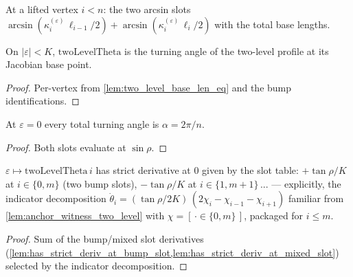 \begin{definition}
  \label{def:two_level_theta}
  At a lifted vertex $i < n$: the two arcsin slots
  $\arcsin(\kappa^{(\varepsilon)}_i\,\ell_{i-1}/2) +
   \arcsin(\kappa^{(\varepsilon)}_i\,\ell_i/2)$ with the total base lengths.
\end{definition}

\begin{lemma}
  \label{lem:turning_angle_two_level}
  On $|\varepsilon| < K$, $\mathrm{twoLevelTheta}$ is the turning angle of the
  two-level profile at its Jacobian base point.
\end{lemma}
\begin{proof}

\leanok
  Per-vertex from \cref{lem:two_level_base_len_eq} and the bump
  identifications.
\end{proof}

\begin{lemma}\leanok
[turning angle at $\varepsilon = 0$]
  \label{lem:two_level_theta_zero}
  At $\varepsilon = 0$ every total turning angle is $\alpha = 2\pi/n$.
\end{lemma}
\begin{proof}

\leanok
  Both slots evaluate at $\sin\rho$.
\end{proof}

\begin{lemma}
  \label{lem:has_strict_deriv_at_two_level_theta}
  $\varepsilon \mapsto \mathrm{twoLevelTheta}\,i$ has strict derivative at $0$
  given by the slot table: $+\tan\rho/K$ at $i \in \{0, m\}$ (two bump slots),
  $-\tan\rho/K$ at $i \in \{1, m{+}1\}$\,... --- explicitly, the indicator
  decomposition $\dot\theta_i = (\tan\rho/2K)\,(2\chi_i - \chi_{i-1} -
  \chi_{i+1})$ familiar from \cref{lem:anchor_witness_two_level} with
  $\chi = [\,\cdot \in \{0,m\}\,]$, packaged for $i \le m$.
\end{lemma}
\begin{proof}

\leanok
  Sum of the bump/mixed slot derivatives
  (\cref{lem:has_strict_deriv_at_bump_slot,lem:has_strict_deriv_at_mixed_slot})
  selected by the indicator decomposition.
\end{proof}

